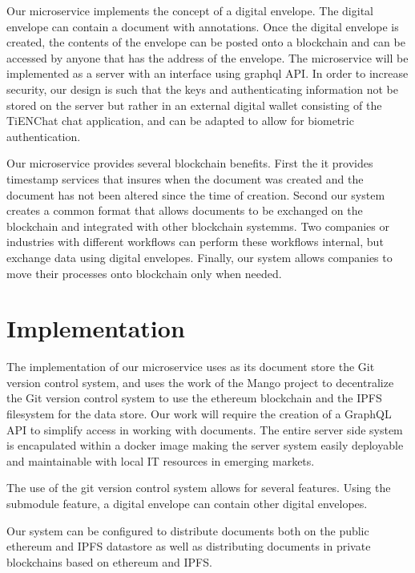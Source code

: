 \documentclass[journal]{IEEEtran}
\begin{document}
Our microservice implements the concept of a digital envelope.  The
digital envelope can contain a document with annotations.  Once the
digital envelope is created, the contents of the envelope can be
posted onto a blockchain and can be accessed by anyone that has the
address of the envelope.  The microservice will be implemented as a
server with an interface using graphql API.  In order to increase
security, our design is such that the keys and authenticating
information not be stored on the server but rather in an external
digital wallet consisting of the TiENChat chat application, and can be
adapted to allow for biometric authentication.

Our microservice provides several blockchain benefits.  First the it
provides timestamp services that insures when the document was created
and the document has not been altered since the time of
creation. Second our system creates a common format that allows
documents to be exchanged on the blockchain and integrated with other
blockchain systemms.  Two companies or industries with different
workflows can perform these workflows internal, but exchange data
using digital envelopes.  Finally, our system allows companies to move
their processes onto blockchain only when needed.

\section{Implementation}

The implementation of our microservice uses as its document store the
Git version control system, and uses the work of the Mango project to
decentralize the Git version control system \cite{git} to use the
ethereum blockchain and the IPFS filesystem\cite{ipfs} for the data
store.  Our work will require the creation of a GraphQL API to
simplify access in working with documents.  The entire server side
system is encapulated within a docker image making the server system
easily deployable and maintainable with local IT resources in emerging
markets.

The use of the git version control system allows for several
features.  Using the submodule feature, a digital envelope can contain
other digital envelopes.

Our system can be configured to distribute documents both on the
public ethereum and IPFS datastore as well as distributing documents
in private blockchains based on ethereum and IPFS.
\end{document}
